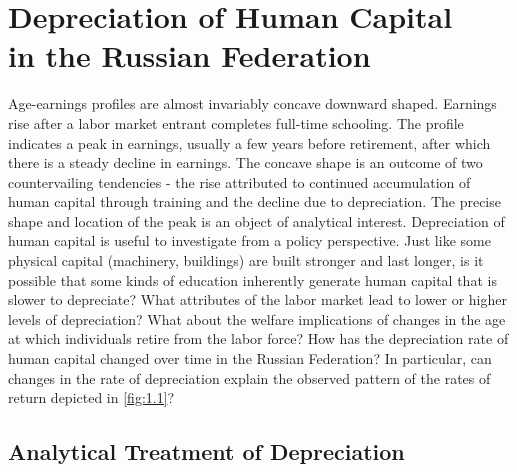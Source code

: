 \documentclass[12pt,a4paper]{article}
\numberwithin{equation}{section}
\begin{document}

\section{Depreciation of Human Capital \\ in the Russian Federation}

Age-earnings profiles are almost invariably concave downward shaped. Earnings rise after a labor market entrant completes full-time schooling. The profile indicates a peak in earnings, usually a few years before retirement, after which there is a steady decline in earnings. The concave shape is an outcome of two countervailing tendencies - the rise attributed to continued accumulation of human capital through training and the decline due to depreciation. The precise shape and location of the peak is an object of analytical interest. Depreciation of human capital is useful to investigate from a policy perspective. Just like some physical capital (machinery, buildings) are built stronger and last longer, is it possible that some kinds of education inherently generate human capital that is slower to depreciate? What attributes of the labor market lead to lower or higher levels of depreciation? What about the welfare implications of changes in the age at which individuals retire from the labor force? How has the depreciation rate of human capital changed over time in the Russian Federation? In particular, can changes in the rate of depreciation explain the observed pattern of the rates of return depicted in \ref{fig:1.1}?  

\subsection{Analytical Treatment of Depreciation} 
\end{document}

